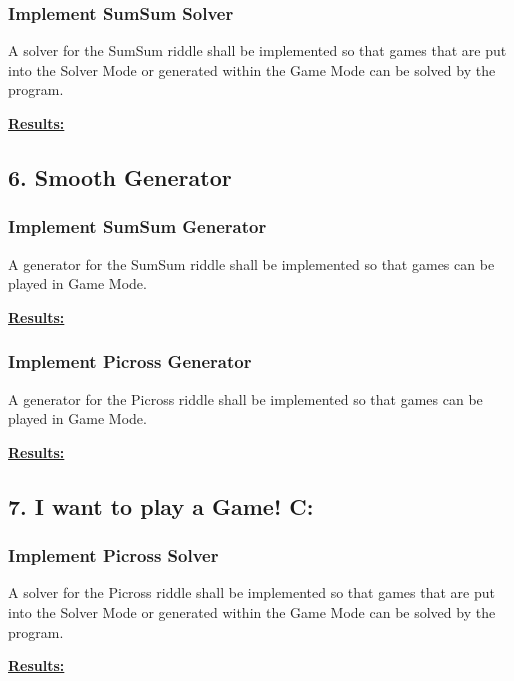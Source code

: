 \documentclass{article}
\begin{document}
	\subsubsection*{Implement SumSum Solver}
	
	A solver for the SumSum riddle shall be implemented so that games that are put into the Solver Mode or generated within the Game Mode can be solved by the program.
	
	\begin{framed}
		\textbf{\underline{Results:}}\\
	\end{framed}
	
	\newpage
	
	\subsection*{6. Smooth Generator}
	
	\subsubsection*{Implement SumSum Generator}
	
	A generator for the SumSum riddle shall be implemented so that games can be played in Game Mode.
	
	\begin{framed}
		\textbf{\underline{Results:}}\\
	\end{framed}
	
	\subsubsection*{Implement Picross Generator}
	
	A generator for the Picross riddle shall be implemented so that games can be played in Game Mode.
	
	\begin{framed}
		\textbf{\underline{Results:}}\\
	\end{framed}

	\newpage
	
	\subsection*{7. I want to play a Game! C:}	
	
	\subsubsection*{Implement Picross Solver}
	
	A solver for the Picross riddle shall be implemented so that games that are put into the Solver Mode or generated within the Game Mode can be solved by the program.
	
	\begin{framed}
		\textbf{\underline{Results:}}\\
	\end{framed}
		
\end{document}
